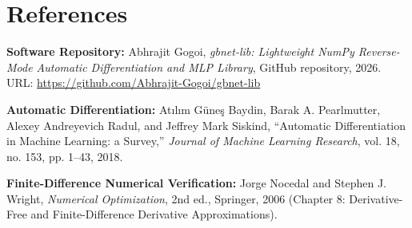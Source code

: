 \documentclass[11pt,a4paper]{article}
\begin{document}
\section*{References}

\noindent
\textbf{Software Repository:} Abhrajit Gogoi, \textit{gbnet-lib: Lightweight NumPy Reverse-Mode Automatic Differentiation and MLP Library}, GitHub repository, 2026. URL: \url{https://github.com/Abhrajit-Gogoi/gbnet-lib}

\noindent
\textbf{Automatic Differentiation:} Atılım Güneş Baydin, Barak A. Pearlmutter, Alexey Andreyevich Radul, and Jeffrey Mark Siskind, ``Automatic Differentiation in Machine Learning: a Survey,'' \textit{Journal of Machine Learning Research}, vol. 18, no. 153, pp. 1--43, 2018.

\noindent
\textbf{Finite-Difference Numerical Verification:} Jorge Nocedal and Stephen J. Wright, \textit{Numerical Optimization}, 2nd ed., Springer, 2006 (Chapter 8: Derivative-Free and Finite-Difference Derivative Approximations).
\end{document}
